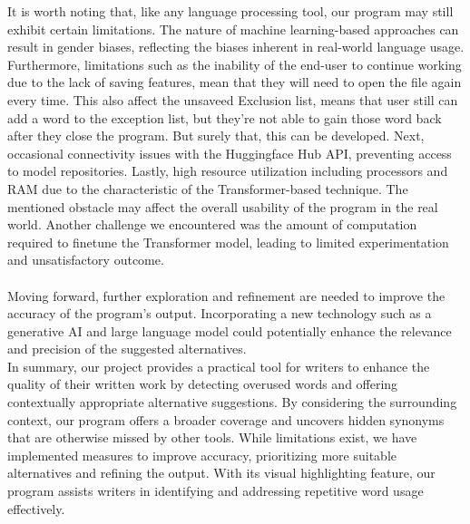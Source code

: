 \documentclass[12pt,oneside,openright,a4paper]{cpe-english-project}
\begin{document}
It is worth noting that, like any language processing tool, our program may still exhibit certain limitations. The nature of machine learning-based approaches can result in gender biases, reflecting the biases inherent in real-world language usage. Furthermore, limitations such as the inability of the end-user to continue working due to the lack of saving features, mean that they will need to open the file again every time. This also affect the unsaveed Exclusion list, means that user still can add a word to the exception list, but they're not able to gain those word back after they close the program. But surely that, this can be developed. Next, occasional connectivity issues with the Huggingface Hub API, preventing access to model repositories. Lastly, high resource utilization including processors and RAM due to the characteristic of the Transformer-based technique. The mentioned obstacle may affect the overall usability of the program in the real world.
Another challenge we encountered was the amount of computation required to finetune the Transformer model, leading to limited experimentation and unsatisfactory outcome.\\\\

Moving forward, further exploration and refinement are needed to improve the accuracy of the program's output. Incorporating a new technology such as a generative AI and large language model could potentially enhance the relevance and precision of the suggested alternatives.\\

In summary, our project provides a practical tool for writers to enhance the quality of their written work by detecting overused words and offering contextually appropriate alternative suggestions. By considering the surrounding context, our program offers a broader coverage and uncovers hidden synonyms that are otherwise missed by other tools. While limitations exist, we have implemented measures to improve accuracy, prioritizing more suitable alternatives and refining the output. With its visual highlighting feature, our program assists writers in identifying and addressing repetitive word usage effectively.



%
%
%
\end{document}
